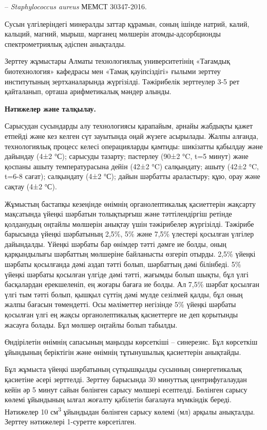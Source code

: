 {{-- \emph{Staphylococcus aureus} МЕМСТ 30347-2016.

Сусын үлгілеріндегі минералды заттар құрамын, соның ішінде натрий,
калий, кальций, магний, мырыш, марганец мөлшерін атомды-адсорбционды
спектрометриялық әдіспен анықталды.

Зерттеу жұмыстары Алматы технологиялық университетінің «Тағамдық
биотехнология» кафедрасы мен «Тамақ қауіпсіздігі» ғылыми зерттеу
институтының зертханаларында жүргізілді. Тәжірибелік зерттеулер 3-5 рет
қайталанып, орташа арифметикалық мәндер алынды.

{\bfseries Нәтижелер және талқылау.}

Сарысудан сусындарды алу технологиясы қарапайым, арнайы жабдықты қажет
етпейді және кез келген сүт зауытында оңай жүзеге асырылады. Жалпы
алғанда, технологиялық процесс келесі операцияларды қамтиды: шикізатты
қабылдау және дайындау (4±2 °С); сарысуды тазарту; пастерлеу (90±2 °C,
t=5 минут) және қоспаны ашыту температурасына дейін (42±2 °C)
салқындату; ашыту (42±2 °C, t=6-8 сағат); салқындату (4±2 °С); дайын
шәрбатты араластыру; құю, орау және сақтау (4±2 °С).

Жұмыстың бастапқы кезеңінде өнімнің органолептикалық қасиеттерін
жақсарту мақсатында үйеңкі шәрбатын толықтырғыш және тәттілендіргіш
ретінде қолданудың оңтайлы мөлшерін анықтау үшін тәжірибелер жүргізілді.
Тәжірибе барысында үйеңкі шәрбатының 2,5\%, 5\% және 7,5\% үлестері
қосылған үлгілер дайындалды. Үйеңкі шәрбаты бар өнімдер тәтті дәмге ие
болды, оның қарқындылығы шәрбаттың мөлшеріне байланысты өзгеріп отырды.
2,5\% үйеңкі шәрбаты қосылғанда дәмі аздап тәтті болып, шәрбаттың дәмі
білінбеді. 5\% үйеңкі шәрбаты қосылған үлгіде дәмі тәтті, жағымды болып
шықты, бұл үлгі басқалардан ерекшеленіп, ең жоғары бағаға ие болды. Ал
7,5\% шәрбат қосылған үлгі тым тәтті болып, қышқыл сүттің дәмі мүлде
сезілмей қалды, бұл оның жалпы бағасын төмендетті. Осы мәліметтер
негізінде 5\% үйеңкі шәрбаты қосылған үлгі ең жақсы органолептикалық
қасиеттерге ие деп қорытынды жасауға болады. Бұл мөлшер оңтайлы болып
табылды.

Өндірілетін өнімнің сапасының маңызды көрсеткіші -- синерезис. Бұл
көрсеткіш ұйындының беріктігін және өнімнің тұтынушылық қасиеттерін
анықтайды.

Бұл жұмыста үйеңкі шәрбатының сүтқышқылды сусынның синергетикалық
қасиетіне әсері зерттелді. Зерттеу барысында 30 минуттық
центрифугалаудан кейін әр 5 минут сайын бөлінген сарысу мөлшері
есептелді. Бөлінген сарысу көлемі ұйындының ылғал жоғалту қабілетін
бағалауға мүмкіндік береді. Нәтижелер 10 см\textsuperscript{3} ұйындыдан
бөлінген сарысу көлемі (мл) арқылы анықталды. Зерттеу нәтижелері
1-суретте көрсетілген.

}}
